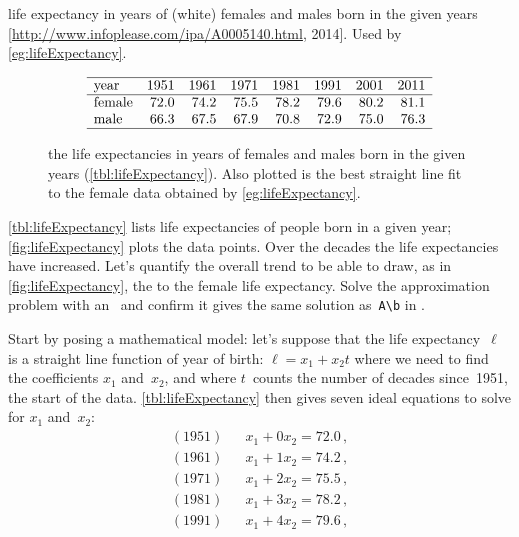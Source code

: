 \begin{example} \label{eg:lifeExpectancy}
\begin{table}
\caption{life expectancy in years of (white) females and males born in the given years  [\url{http://www.infoplease.com/ipa/A0005140.html}, 2014].  Used by \autoref{eg:lifeExpectancy}.}
\label{tbl:lifeExpectancy}
\begin{equation*}
\begin{array}{lrrrrrrrr} \hline
\text{year}&1951&1961&1971&1981&1991&2001&2011\\\hline
\text{female}&72.0&74.2&75.5&78.2&79.6&80.2&81.1\\
\text{male}&66.3&67.5&67.9&70.8&72.9&75.0&76.3\\\hline
\end{array}
\end{equation*}
\end{table}
\begin{figure}
\centering

\caption{the life expectancies in years of females and males born in the given years (\autoref{tbl:lifeExpectancy}).  Also plotted is the best straight line fit to the female data obtained by \autoref{eg:lifeExpectancy}.}
\label{fig:lifeExpectancy}
\end{figure}
\autoref{tbl:lifeExpectancy} lists life expectancies of people born in a given year; \autoref{fig:lifeExpectancy} plots the data points.
Over the decades the life expectancies have increased.
Let's quantify the overall trend to be able to draw, as in \autoref{fig:lifeExpectancy}, the  to the female life expectancy.
Solve the approximation problem with an \svd\ and confirm it gives the same solution as~\verb|A\b| in \script.
\begin{solution} 
Start by posing a mathematical model: let's suppose that the life expectancy~\(\ell\) is a straight line function of year of birth: \(\ell=x_1+x_2t\) where we need to find the coefficients \(x_1\) and~\(x_2\), and where \(t\)~counts the number of decades since~1951, the start of the data.
\autoref{tbl:lifeExpectancy} then gives seven ideal equations to solve for \(x_1\) and~\(x_2\):
\begin{eqnarray*}
(1951)&&x_1+0x_2=72.0\,,
\\(1961)&&x_1+1x_2=74.2\,,
\\(1971)&&x_1+2x_2=75.5\,,
\\(1981)&&x_1+3x_2=78.2\,,
\\(1991)&&x_1+4x_2=79.6\,,

\end{eqnarray*}
\end{solution}
\end{example}
